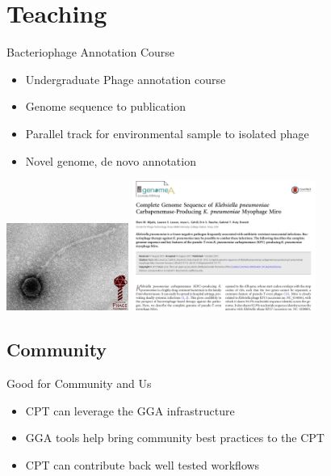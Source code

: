 \documentclass[12pt]{phage3slides} %
\begin{document}
\section{Teaching}
\begin{frame}{Bacteriophage Annotation Course}
    \begin{itemize}
        \item Undergraduate Phage annotation course
        \item Genome sequence to publication
        \item Parallel track for environmental sample to isolated phage
        \item Novel genome, de novo annotation
    \end{itemize}
    \includegraphics[width=4cm]{phage.png}
    \includegraphics[width=6cm]{pub.png}
\end{frame}

\subsection{Community}
\begin{frame}{Good for Community and Us}
    \begin{itemize}
        \item CPT can leverage the GGA infrastructure
        \item GGA tools help bring community best practices to the CPT
        \item CPT can contribute back well tested workflows
    \end{itemize}
\end{frame}
\end{document}

